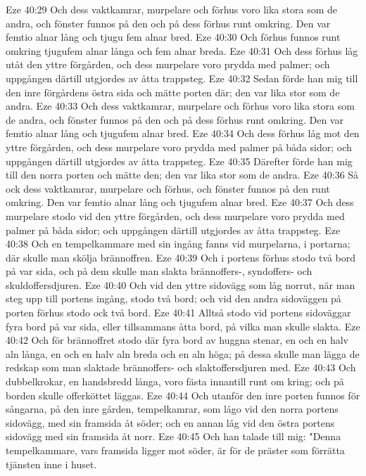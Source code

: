 Eze 40:29  Och dess vaktkamrar, murpelare och förhus voro lika stora som de andra, och fönster funnos på den och på dess förhus runt omkring. Den var femtio alnar lång och tjugu fem alnar bred.
Eze 40:30  Och förhus funnos runt omkring tjugufem alnar långa och fem alnar breda.
Eze 40:31  Och dess förhus låg utåt den yttre förgården, och dess murpelare voro prydda med palmer; och uppgången därtill utgjordes av åtta trappsteg.
Eze 40:32  Sedan förde han mig till den inre förgårdens östra sida och mätte porten där; den var lika stor som de andra.
Eze 40:33  Och dess vaktkamrar, murpelare och förhus voro lika stora som de andra, och fönster funnos på den och på dess förhus runt omkring. Den var femtio alnar lång och tjugufem alnar bred.
Eze 40:34  Och dess förhus låg mot den yttre förgården, och dess murpelare voro prydda med palmer på båda sidor; och uppgången därtill utgjordes av åtta trappsteg.
Eze 40:35  Därefter förde han mig till den norra porten och mätte den; den var lika stor som de andra.
Eze 40:36  Så ock dess vaktkamrar, murpelare och förhus, och fönster funnos på den runt omkring. Den var femtio alnar lång och tjugufem alnar bred.
Eze 40:37  Och dess murpelare stodo vid den yttre förgården, och dess murpelare voro prydda med palmer på båda sidor; och uppgången därtill utgjordes av åtta trappsteg.
Eze 40:38  Och en tempelkammare med sin ingång fanns vid murpelarna, i portarna; där skulle man skölja brännoffren.
Eze 40:39  Och i portens förhus stodo två bord på var sida, och på dem skulle man slakta brännoffers-, syndoffers- och skuldoffersdjuren.
Eze 40:40  Och vid den yttre sidovägg som låg norrut, när man steg upp till portens ingång, stodo två bord; och vid den andra sidoväggen på porten förhus stodo ock två bord.
Eze 40:41  Alltså stodo vid portens sidoväggar fyra bord på var sida, eller tillsammans åtta bord, på vilka man skulle slakta.
Eze 40:42  Och för brännoffret stodo där fyra bord av huggna stenar, en och en halv aln långa, en och en halv aln breda och en aln höga; på dessa skulle man lägga de redskap som man slaktade brännoffers- och slaktoffersdjuren med.
Eze 40:43  Och dubbelkrokar, en handsbredd långa, voro fästa innantill runt om kring; och på borden skulle offerköttet läggas.
Eze 40:44  Och utanför den inre porten funnos för sångarna, på den inre gården, tempelkamrar, som lågo vid den norra portens sidovägg, med sin framsida åt söder; och en annan låg vid den östra portens sidovägg med sin framsida åt norr.
Eze 40:45  Och han talade till mig: "Denna tempelkammare, vars framsida ligger mot söder, är för de präster som förrätta tjänsten inne i huset.
